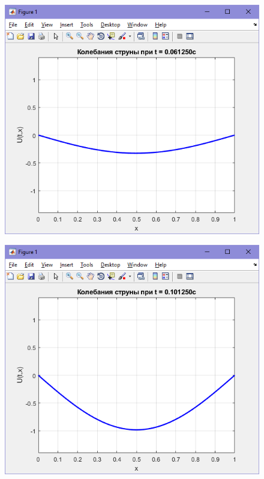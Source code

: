 \documentclass[a4paper]{article}
\begin{document}
\begin{figure}[h]
    \begin{center}
    \begin{minipage}[h]{0.4\linewidth}
    \includegraphics[width=1\linewidth]{img/result_2.png}
    \caption{} %
    \label{ris:experimoriginal}
    \end{minipage}
    \end{center}
\end{figure}

\begin{figure}[]
    \begin{center}
    \begin{minipage}[h]{0.4\linewidth}
    \includegraphics[width=1\linewidth]{img/result_3.png}
    \caption{} %
    \label{ris:experimoriginal}
    \end{minipage}
    \end{center}
\end{figure}
\end{document}
